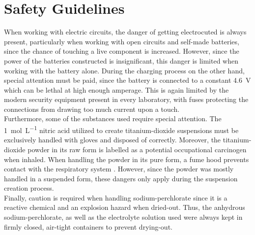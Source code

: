 \section{Safety Guidelines}
When working with electric circuits, the danger of getting electrocuted is always present, particularly when working with open circuits and self-made batteries, since the chance of touching a live component is increased. However, since the power of the batteries constructed is insignificant, this danger is limited when working with the battery alone. During the charging process on the other hand, special attention must be paid, since the battery is connected to a constant \SI{4.6}{\V} which can be lethal at high enough amperage. This is again limited by the modern security equipment present in every laboratory, with fuses protecting the connections from drawing too much current upon a touch.\\
Furthermore, some of the substances used require special attention. The \SI{1}{\mol\per\L} nitric acid utilized to create titanium-dioxide suspensions must be exclusively handled with gloves and disposed of correctly. Moreover, the titanium-dioxide powder in its raw form is labelled as a potential occupational carcinogen when inhaled. When handling the powder in its pure form, a fume hood prevents contact with the respiratory system \cite{Prevention2019}. However, since the powder was mostly handled in a suspended form, these dangers only apply during the suspension creation process.\\
Finally, caution is required when handling sodium-perchlorate since it is a reactive chemical and an explosion hazard when dried-out. Thus, the anhydrous sodium-perchlorate, as well as the electrolyte solution used were always kept in firmly closed, air-tight containers to prevent drying-out.
